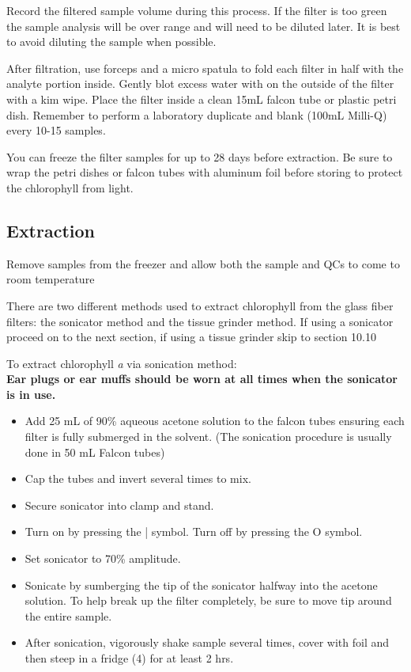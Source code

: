 \documentclass[12pt]{../SOP3}\usepackage[]{graphicx}\usepackage[]{color}
\begin{document}
\NP Record the filtered sample volume during this process. If the filter is too green the sample analysis will be over range and will need to be diluted later.  It is best to avoid diluting the sample when possible. 

\NP After filtration, use forceps and a micro spatula to fold each filter in half with the analyte portion inside. Gently blot excess water with on the outside of the filter with a kim wipe. Place the filter inside a clean 15mL falcon tube or plastic petri dish.  
\NP Remember to perform a laboratory duplicate and blank (100mL Milli-Q) every 10-15 samples.

\NP You can freeze the filter samples for up to 28 days before extraction. Be sure to wrap the petri dishes or falcon tubes with aluminum foil before storing to protect the chlorophyll from light. 

\subsection*{Extraction}

\NP Remove samples from the freezer and allow both the sample and QCs to come to room temperature

\NP There are two different methods used to extract chlorophyll from the glass fiber filters: the sonicator method and the tissue grinder method. If using a sonicator proceed on to the next section, if using a tissue grinder skip to section 10.10

\NP To extract chlorophyll \textit{a} via sonication method:
\\ \textbf{Ear plugs or ear muffs should be worn at all times when the sonicator is in use.}
\begin{itemize}
\item Add 25 mL of 90\% aqueous acetone solution to the falcon tubes ensuring each filter is fully submerged in the solvent. (The sonication procedure is usually done in 50 mL Falcon tubes)
\item Cap the tubes and invert several times to mix. 
\item Secure sonicator into clamp and stand. 
\item Turn on by pressing the | symbol. Turn off by pressing the O symbol.
\item Set sonicator to 70\% amplitude. 
\item  Sonicate by sumberging the tip of the sonicator halfway into the acetone solution. To help break up the filter completely, be sure to move tip around the entire sample.
\item After sonication, vigorously shake sample several times, cover with foil and then steep in a fridge (4\celsius) for at least 2 hrs.
\end{itemize}
\end{document}
